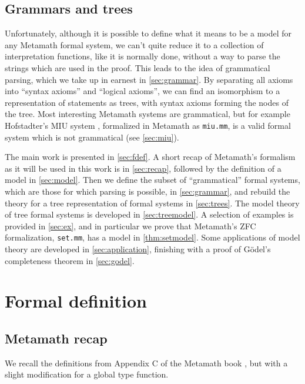 \documentclass[runningheads,a4paper]{llncs}
\begin{document}
\subsection{Grammars and trees}\label{sec:introgrammar}
Unfortunately, although it is possible to define what it means to be a model for any Metamath formal system, we can't quite reduce it to a collection of interpretation functions, like it is normally done, without a way to parse the strings which are used in the proof. This leads to the idea of grammatical parsing, which we take up in earnest in \autoref{sec:grammar}. By separating all axioms into ``syntax axioms'' and ``logical axioms'', we can find an isomorphism to a representation of statements as trees, with syntax axioms forming the nodes of the tree. Most interesting Metamath systems are grammatical, but for example Hofstadter's MIU system \cite{hofstadter}, formalized in Metamath as \texttt{miu.mm}, is a valid formal system which is not grammatical (see \autoref{sec:miu}).

The main work is presented in \autoref{sec:fdef}. A short recap of Metamath's formalism as it will be used in this work is in \autoref{sec:recap}, followed by the definition of a model in \autoref{sec:model}. Then we define the subset of ``grammatical'' formal systems, which are those for which parsing is possible, in \autoref{sec:grammar}, and rebuild the theory for a tree representation of formal systems in \autoref{sec:trees}. The model theory of tree formal systems is developed in \autoref{sec:treemodel}. A selection of examples is provided in \autoref{sec:ex}, and in particular we prove that Metamath's \textsf{ZFC} formalization, \texttt{set.mm}, has a model in \autoref{thm:setmodel}. Some applications of model theory are developed in \autoref{sec:application}, finishing with a proof of G\"{o}del's completeness theorem in \autoref{sec:godel}.

\section{Formal definition}\label{sec:fdef}
\subsection{Metamath recap}\label{sec:recap}
We recall the definitions from Appendix C of the Metamath book \cite{metamath}, but with a slight modification for a global type function.
\end{document}
